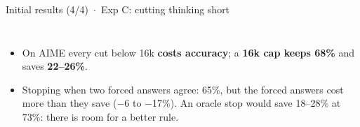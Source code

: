 \documentclass[aspectratio=169,9pt]{beamer}
\begin{document}
\begin{frame}{Initial results (4/4) \,$\cdot$\, Exp C: cutting thinking short}
\begin{columns}[T,onlytextwidth]
    \raggedright
    \begin{itemize}\scriptsize
      \item On AIME every cut below 16k \textbf{costs accuracy}; a \textbf{16k cap keeps 68\%} and saves \textbf{22--26\%}.
      \item Stopping when two forced answers agree: 65\%, but the forced answers cost more than they save ($-$6 to $-$17\%).
        An oracle stop would save 18--28\% at 73\%: there is room for a better rule.
    \end{itemize}
  \end{columns}
\end{frame}
\end{document}
